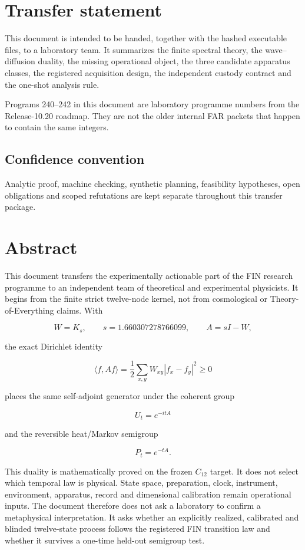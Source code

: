 \documentclass[11pt,a4paper,openany]{report}
\begin{document}
\chapter*{Transfer statement}
This document is intended to be handed, together with the hashed executable
files, to a laboratory team.  It summarizes the finite spectral theory,
the wave--diffusion duality, the missing operational object, the three
candidate apparatus classes, the registered acquisition design, the
independent custody contract and the one-shot analysis rule.

Programs 240--242 in this document are laboratory programme numbers from the
Release-10.20 roadmap.  They are not the older internal FAR packets that
happen to contain the same integers.

\tableofcontents
\clearpage
{}

\section{Confidence convention}

Analytic proof, machine checking, synthetic planning, feasibility hypotheses, open obligations and scoped refutations are kept separate throughout this transfer package.

\chapter{Abstract}

This document transfers the experimentally actionable part of the FIN research programme to an independent team of theoretical and experimental physicists. It begins from the finite strict twelve-node kernel, not from cosmological or Theory-of-Everything claims. With

\[
W=K_s,\qquad s=1.660307278766099,\qquad A=sI-W,
\]

the exact Dirichlet identity

\[
\langle f,Af\rangle
=
\frac12\sum_{x,y}W_{xy}|f_x-f_y|^2
\geq 0
\]

places the same self-adjoint generator under the coherent group

\[
U_t=e^{-itA}
\]

and the reversible heat/\allowbreak{}Markov semigroup

\[
P_t=e^{-tA}.
\]

This duality is mathematically proved on the frozen \(C_{12}\) target. It does not select which temporal law is physical. State space, preparation, clock, instrument, environment, apparatus, record and dimensional calibration remain operational inputs. The document therefore does not ask a laboratory to confirm a metaphysical interpretation. It asks whether an explicitly realized, calibrated and blinded twelve-state process follows the registered FIN transition law and whether it survives a one-time held-out semigroup test.
\end{document}
